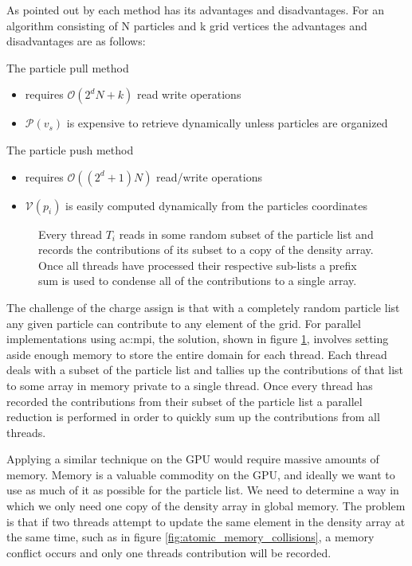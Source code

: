 As pointed out by \cite{Stantchev2008} each method has its advantages and disadvantages. For an algorithm consisting of N particles and k grid vertices the advantages and disadvantages are as follows:

The particle pull method
\begin{itemize}
\item requires $\mathcal{O}(2^dN + k)$ read write operations
\item $\mathcal{P}(v_s)$ is expensive to retrieve dynamically unless particles are organized
\end{itemize}

The particle push method
\begin{itemize}
\item requires $\mathcal{O}((2^d+1)N)$ read/write operations
\item $\mathcal{V}(p_i)$ is easily computed dynamically from the particles coordinates
\end{itemize}


\begin{figure}
\begin{center}

\end{center}
\caption[Charge Assign using MPI]{Every thread $T_i$ reads in some random subset of the particle list and records the contributions of its subset to a copy of the density array. Once all threads have processed their respective sub-lists a prefix sum is used to condense all of the contributions to a single array.}
\label{fig:mpi_chargeassign}
\end{figure}

The challenge of the charge assign is that with a completely random particle list any given particle can contribute to any element of the grid. For parallel implementations using \gls{ac:mpi}, the solution, shown in figure \ref{fig:mpi_chargeassign}, involves setting aside enough memory to store the entire domain for each thread. Each thread deals with a subset of the particle list and tallies up the contributions of that list to some array in memory private to a single thread. Once every thread has recorded the contributions from their subset of the particle list a parallel reduction is performed in order to quickly sum up the contributions from all threads. 


Applying a similar technique on the GPU would require massive amounts of memory. Memory is a valuable commodity on the GPU, and ideally we want to use as much of it as possible for the particle list. We need to determine a way in which we only need one copy of the density array in global memory. The problem is that if two threads attempt to update the same element in the density array at the same time, such as in figure \ref{fig:atomic_memory_collisions}, a memory conflict occurs and only one threads contribution will be recorded. 

